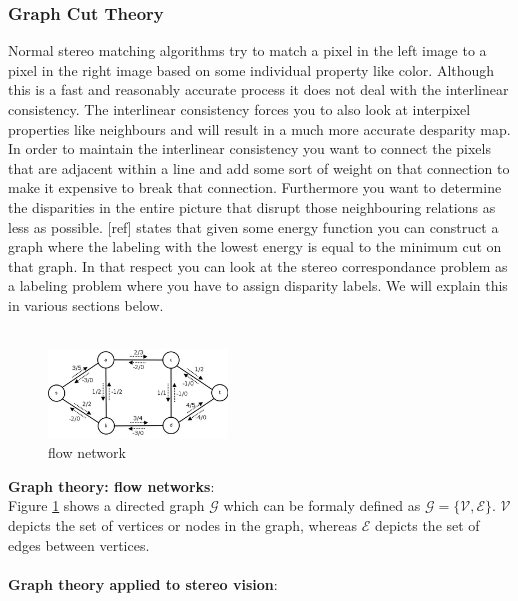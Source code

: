 \documentclass[a4paper]{article}
\begin{document}
\subsubsection{Graph Cut Theory}
\label{gc_theory}
Normal stereo matching algorithms try to match a pixel in the left image to a pixel in the right image based on some individual
property like color. Although this is a fast and reasonably accurate process it does not deal with the interlinear consistency.
The interlinear consistency forces you to also look at interpixel properties like neighbours and will result in a much more accurate desparity map.
\\
In order to maintain the interlinear consistency you want to connect the pixels that are adjacent within a line and add some
sort of weight on that connection to make it expensive to break that connection. Furthermore you want to determine the disparities
in the entire picture that disrupt those neighbouring relations as less as possible. [ref] states that given some energy function
you can construct a graph where the labeling with the lowest energy is equal to the minimum cut on that graph. In that respect you can 
look at the stereo correspondance problem as a labeling problem where you have to assign disparity labels.
We will explain this in various sections below.\\\\
\begin{figure}[t] \centering
\includegraphics[width=180px]{Network_flow.png}
\caption{flow network}
\label{flow_network}
\end{figure}
\noindent\textbf{Graph theory: flow networks}:\indent\\
Figure \ref{flow_network} shows a directed graph $\mathcal{G}$ which can be formaly defined as $\mathcal{G} = \{\mathcal{V},\mathcal{E}\}$.
$\mathcal{V}$ depicts the set of vertices or nodes in the graph, whereas $\mathcal{E}$ depicts the set of edges between vertices.\\\\
\noindent\textbf{Graph theory applied to stereo vision}:\indent\\
\end{document}
